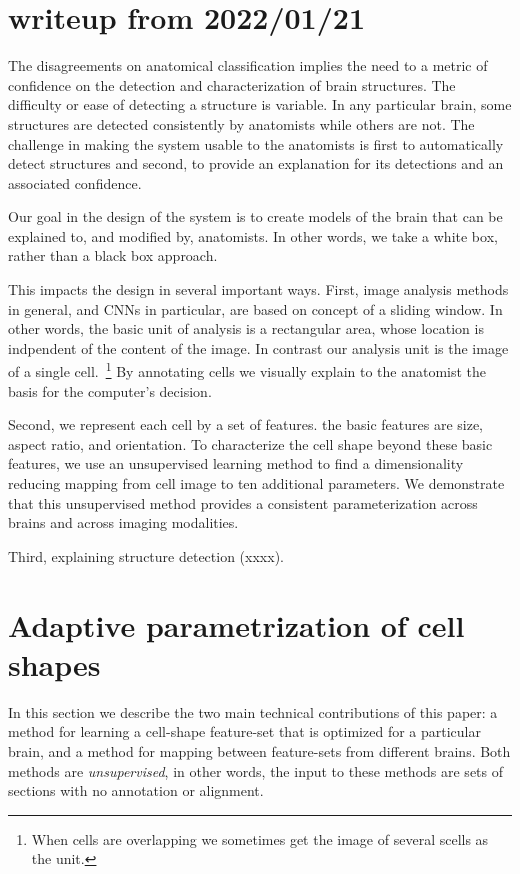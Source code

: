 \documentclass[runningheads]{llncs}
\begin{document}
\begin{enumerate}
\iffalse
\section{writeup from 2022/01/21}
The disagreements on anatomical classification implies the need to a metric of confidence on the detection and characterization of brain structures.
The difficulty or ease of detecting a structure is variable. 
In any particular brain, some structures are detected consistently by anatomists while others are not.
The challenge in making the system usable to the anatomists is first to automatically detect structures and second, to provide an explanation for its detections and an associated confidence.

Our goal in the design of the system is to create models of the brain
that can be explained to, and modified by, anatomists. In other words,
we take a white box, rather than a black box approach.

This impacts the design in several important ways. First, image
analysis methods in general, and CNNs in particular, are based on
concept of a sliding window. In other words, the basic unit of
analysis is a rectangular area, whose location is indpendent of the
content of the image. In contrast our analysis unit is the image of a
single cell.~\footnote{When cells are overlapping we sometimes get
  the image of several scells as the unit.} By annotating cells we
visually explain to the anatomist the basis for the computer's
decision.

Second, we represent each cell by a set of features. the basic 
features are size, aspect ratio, and orientation. To characterize the
cell shape beyond these basic features, we use an unsupervised
learning method to find a dimensionality reducing mapping from cell
image to ten additional parameters. We demonstrate that this
unsupervised method provides a consistent parameterization across
brains and across imaging modalities.

Third, explaining structure detection (xxxx).



\section{Adaptive parametrization of cell shapes}
\label{sec:DM}
In this section we describe the two main technical contributions of this
paper: a method for learning a cell-shape feature-set that is optimized
for a particular brain, and a method for mapping between feature-sets
from different brains. Both methods are {\em unsupervised}, in other
words, the input to these methods are sets of sections with no
annotation or alignment.


\end{enumerate}
\end{document}
